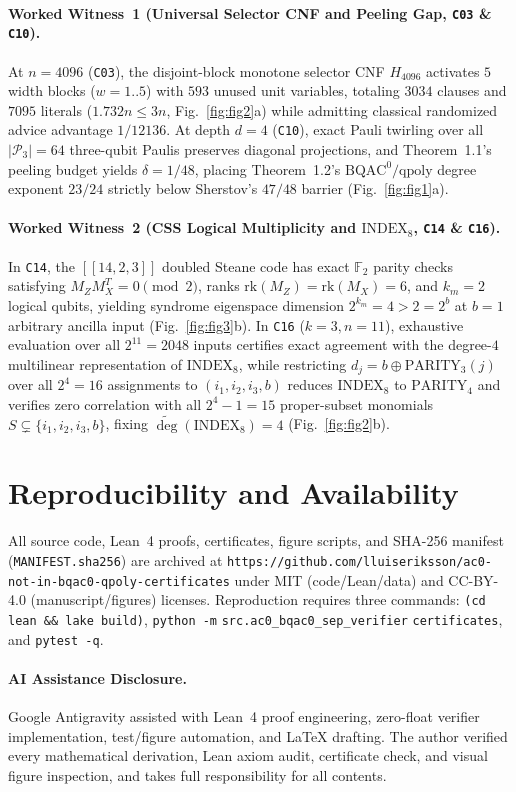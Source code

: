 \documentclass[10pt,twocolumn]{article}
\begin{document}
\paragraph{Worked Witness~1 (Universal Selector CNF and Peeling Gap, \texttt{C03} \& \texttt{C10}).}
At $n=4096$ (\texttt{C03}), the disjoint-block monotone selector CNF $H_{4096}$ activates $5$ width blocks ($w=1..5$) with $593$ unused unit variables, totaling $3034$ clauses and $7095$ literals ($1.732n \le 3n$, Fig.~\ref{fig:fig2}a) while admitting classical randomized advice advantage $1/12136$. At depth $d=4$ (\texttt{C10}), exact Pauli twirling over all $|\mathcal{P}_3|=64$ three-qubit Paulis preserves diagonal projections, and Theorem~1.1's peeling budget yields $\delta = 1/48$, placing Theorem~1.2's $\mathrm{BQAC}^0/\mathrm{qpoly}$ degree exponent $23/24$ strictly below Sherstov's $47/48$ barrier (Fig.~\ref{fig:fig1}a).

\paragraph{Worked Witness~2 (CSS Logical Multiplicity and $\mathrm{INDEX}_8$, \texttt{C14} \& \texttt{C16}).}
In \texttt{C14}, the $[[14,2,3]]$ doubled Steane code has exact $\mathbb{F}_2$ parity checks satisfying $M_Z M_X^T = 0 \pmod 2$, ranks $\mathrm{rk}(M_Z)=\mathrm{rk}(M_X)=6$, and $k_m = 2$ logical qubits, yielding syndrome eigenspace dimension $2^{k_m} = 4 > 2 = 2^b$ at $b=1$ arbitrary ancilla input (Fig.~\ref{fig:fig3}b). In \texttt{C16} ($k=3, n=11$), exhaustive evaluation over all $2^{11} = 2048$ inputs certifies exact agreement with the degree-$4$ multilinear representation of $\mathrm{INDEX}_8$, while restricting $d_j = b \oplus \mathrm{PARITY}_3(j)$ over all $2^4 = 16$ assignments to $(i_1,i_2,i_3,b)$ reduces $\mathrm{INDEX}_8$ to $\mathrm{PARITY}_4$ and verifies zero correlation with all $2^4 - 1 = 15$ proper-subset monomials $S \subsetneq \{i_1,i_2,i_3,b\}$, fixing $\widetilde{\deg}(\mathrm{INDEX}_8) = 4$ (Fig.~\ref{fig:fig2}b).

\section{Reproducibility and Availability}
All source code, Lean~4 proofs, certificates, figure scripts, and SHA-256 manifest (\texttt{MANIFEST.sha256}) are archived at \nolinkurl{https://github.com/lluiseriksson/ac0-not-in-bqac0-qpoly-certificates} under MIT (code/Lean/data) and CC-BY-4.0 (manuscript/figures) licenses. Reproduction requires three commands: \texttt{(cd lean \&\& lake build)}, \texttt{python -m} \nolinkurl{src.ac0_bqac0_sep_verifier} \texttt{certificates}, and \texttt{pytest -q}.

\paragraph{AI Assistance Disclosure.}
Google Antigravity assisted with Lean~4 proof engineering, zero-float verifier implementation, test/figure automation, and LaTeX drafting. The author verified every mathematical derivation, Lean axiom audit, certificate check, and visual figure inspection, and takes full responsibility for all contents.



\end{document}
